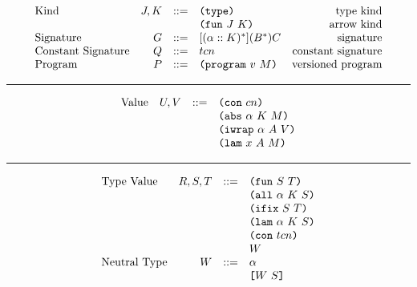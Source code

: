 \documentclass[../plutus-core-specification.tex]{subfiles}
\begin{document}
\begin{minipage}{\linewidth}
\[\begin{array}{lrclr}
        \textrm{Kind}             & J,K    & ::= & \texttt{(} \texttt{type} \texttt{)}{}                   & \textrm{type kind}\\
                                  &        &     & \texttt{(} \texttt{fun} ~ J ~ K \texttt{)}                & \textrm{arrow kind}\\
        \textrm{Signature}        & G      & ::= & [(\alpha :: K)^*](B^*)C     & \textrm{signature}\\
        \textrm{Constant Signature}   & Q      & ::= & tcn                    & \textrm{constant signature}\\
        \textrm{Program}          & P      & ::= & \texttt{(} \texttt{program} ~ v ~ M \texttt{)}             & \textrm{versioned program}

    \end{array}\]
    \label{fig:grammar}
\end{minipage}

\medskip
\hrule
\medskip

\begin{minipage}{\linewidth}
    \centering
    \[\begin{array}{lrcl}
        \textrm{Value}            & U, V   & ::= & \texttt{(} \texttt{con} ~ cn \texttt{)}             \\
                                  &        &     & \texttt{(} \texttt{abs} ~ \alpha ~ K ~ M \texttt{)}   \\
                                  &        &     & \texttt{(} \texttt{iwrap} ~ \alpha ~ A ~ V \texttt{)} \\
                                  &        &     & \texttt{(} \texttt{lam} ~ x ~ A ~ M \texttt{)}
    \end{array}\]
    \label{fig:values}
\end{minipage}

\medskip
\hrule
\medskip

\begin{minipage}{\linewidth}
    \centering
    \[\begin{array}{lrcl}
        \textrm{Type Value}       & R,S,T  & ::= & \texttt{(} \texttt{fun} ~ S ~ T \texttt{)}          \\
                                  &        &     & \texttt{(} \texttt{all} ~ \alpha ~ K ~ S \texttt{)}  \\
                                  &        &     & \texttt{(} \texttt{ifix} ~ S ~ T \texttt{)}          \\
                                  &        &     & \texttt{(} \texttt{lam} ~ \alpha ~ K ~ S \texttt{)}  \\
                                  &        &     & \texttt{(} \texttt{con} ~ tcn \texttt{)}           \\
                                  &        &     & W                    \\
        \textrm{Neutral Type}     & W      & ::= & \alpha               \\
                                  &        &     & \texttt{[} W ~ S \texttt{]}          \\
    \end{array}\]
    \label{fig:type-values}
\end{minipage}
\end{document}
